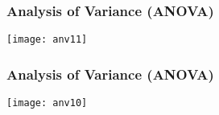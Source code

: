 \begin{frame}[fragile]\frametitle{Analysis of Variance (ANOVA)}
\begin{center}
\texttt{[image: anv11]}
\end{center}
\end{frame}

\begin{frame}[fragile]\frametitle{Analysis of Variance (ANOVA)}
\begin{center}
\texttt{[image: anv10]}
\end{center}
\end{frame}


